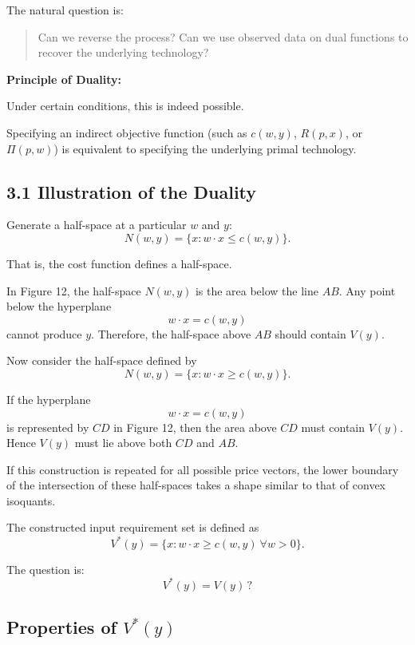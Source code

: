 \medskip

The natural question is:

\begin{quote}
Can we reverse the process?  
Can we use observed data on dual functions to recover the underlying technology?
\end{quote}

\medskip

\textbf{Principle of Duality:}

Under certain conditions, this is indeed possible.

Specifying an indirect objective function (such as $c(w,y)$, $R(p,x)$, or $\Pi(p,w)$)
is equivalent to specifying the underlying primal technology.




\subsection*{3.1 Illustration of the Duality}

Generate a half-space at a particular $w$ and $y$:
\[
N(w,y)=\{x : w\cdot x \le c(w,y)\}.
\]

That is, the cost function defines a half-space.

\medskip

In Figure 12, the half-space $N(w,y)$ is the area below the line $AB$.
Any point below the hyperplane
\[
w\cdot x = c(w,y)
\]
cannot produce $y$.
Therefore, the half-space above $AB$ should contain $V(y)$.

Now consider the half-space defined by
\[
N(w,y)=\{x : w\cdot x \ge c(w,y)\}.
\]

If the hyperplane
\[
w\cdot x = c(w,y)
\]
is represented by $CD$ in Figure 12, then the area above $CD$ must contain $V(y)$.
Hence $V(y)$ must lie above both $CD$ and $AB$.

If this construction is repeated for all possible price vectors,
the lower boundary of the intersection of these half-spaces takes a shape
similar to that of convex isoquants.

\medskip

The constructed input requirement set is defined as
\[
V^*(y)=\{x : w\cdot x \ge c(w,y)\ \forall w>0\}.
\]

The question is:
\[
V^*(y)=V(y)\, ?
\]

\subsection*{Properties of $V^*(y)$}

